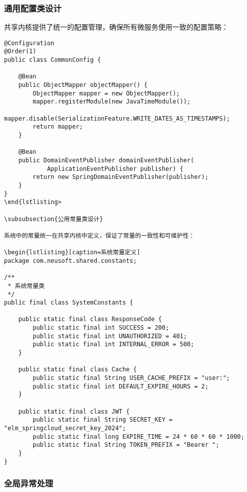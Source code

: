 \documentclass[a4paper,12pt]{article}
\begin{document}
\subsubsection{通用配置类设计}

共享内核提供了统一的配置管理，确保所有微服务使用一致的配置策略：

\begin{lstlisting}[caption=通用配置类]
@Configuration
@Order(1)
public class CommonConfig {
    
    @Bean
    public ObjectMapper objectMapper() {
        ObjectMapper mapper = new ObjectMapper();
        mapper.registerModule(new JavaTimeModule());
        mapper.disable(SerializationFeature.WRITE_DATES_AS_TIMESTAMPS);
        return mapper;
    }
    
    @Bean
    public DomainEventPublisher domainEventPublisher(
            ApplicationEventPublisher publisher) {
        return new SpringDomainEventPublisher(publisher);
    }
}
\end{lstlisting>

\subsubsection{公用常量类设计}

系统中的常量统一在共享内核中定义，保证了常量的一致性和可维护性：

\begin{lstlisting}[caption=系统常量定义]
package com.neusoft.shared.constants;

/**
 * 系统常量类
 */
public final class SystemConstants {
    
    public static final class ResponseCode {
        public static final int SUCCESS = 200;
        public static final int UNAUTHORIZED = 401;
        public static final int INTERNAL_ERROR = 500;
    }
    
    public static final class Cache {
        public static final String USER_CACHE_PREFIX = "user:";
        public static final int DEFAULT_EXPIRE_HOURS = 2;
    }
    
    public static final class JWT {
        public static final String SECRET_KEY = "elm_springcloud_secret_key_2024";
        public static final long EXPIRE_TIME = 24 * 60 * 60 * 1000;
        public static final String TOKEN_PREFIX = "Bearer ";
    }
}
\end{lstlisting}

\subsubsection{全局异常处理}
\end{document}
